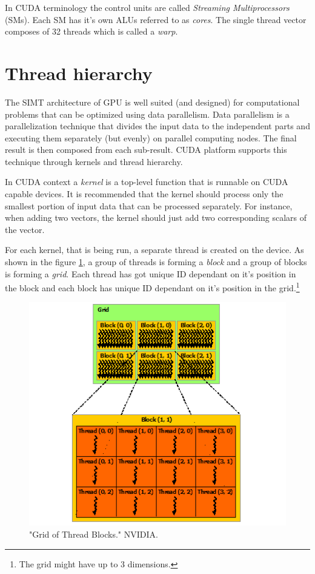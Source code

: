 \documentclass[12pt,oneside]{fithesis2}
\begin{document}
In CUDA terminology the control units are called \emph{Streaming Multiprocessors} (SMs). Each SM has it's own ALUs referred to as \emph{cores}. The single thread vector composes of 32 threads which is called a \emph{warp}.


\section{Thread hierarchy}

The SIMT architecture of GPU is well suited (and designed) for computational problems that can be optimized using data parallelism. Data parallelism is a parallelization technique that divides the input data to the independent parts and executing them separately (but evenly) on parallel computing nodes. The final result is then composed from each sub-result. CUDA platform supports this technique through kernels and thread hierarchy.

In CUDA context a \emph{kernel} is a top-level function that is runnable on CUDA capable devices. It is recommended that the kernel should process only the smallest portion of input data that can be processed separately. For instance, when adding two vectors, the kernel should just add two corresponding scalars of the vector.

For each kernel, that is being run, a separate thread is created on the device. As shown in the figure \ref{fig:grid}, a group of threads is forming a \emph{block} and a group of blocks is forming a \emph{grid}. Each thread has got unique ID dependant on it's position in the block and each block has unique ID dependant on it's position in the grid.\footnote{The grid might have up to 3 dimensions.}

\begin{figure}[H]
	\centering
	\includegraphics{figures/grid-of-thread-blocks.png}
	\caption{"Grid of Thread Blocks." NVIDIA. \cite{cuda_guide}}
	\label{fig:grid}
\end{figure}
\end{document}
